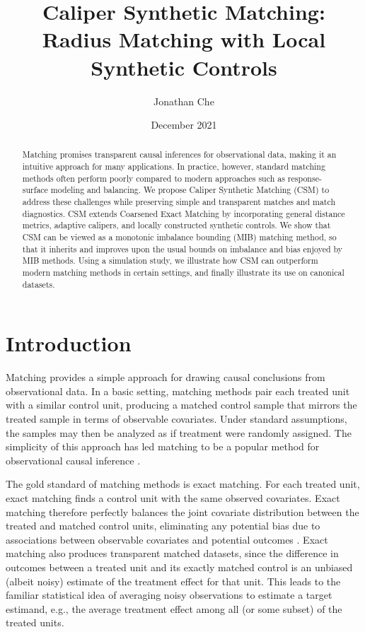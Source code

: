 \documentclass{article}
\title{Caliper Synthetic Matching: Radius Matching with Local Synthetic Controls}
\author{Jonathan Che}
\date{December 2021}
\begin{document}
\maketitle

\begin{abstract}
    Matching promises transparent causal inferences for observational data, making it an intuitive approach for many applications.
    In practice, however, standard matching methods often perform poorly compared to modern approaches such as response-surface modeling and balancing.
    We propose Caliper Synthetic Matching (CSM) to address these challenges while preserving simple and transparent matches and match diagnostics.
    CSM extends Coarsened Exact Matching \citep[CEM; ][]{iacus2012causal} by incorporating general distance metrics, adaptive calipers, and locally constructed synthetic controls.
    We show that CSM can be viewed as a monotonic imbalance bounding (MIB) matching method, so that it inherits and improves upon the usual bounds on imbalance and bias enjoyed by MIB methods.
    Using a simulation study, we illustrate how CSM can outperform modern matching methods in certain settings, and finally illustrate its use on canonical datasets.
\end{abstract}

\section{Introduction}

Matching provides a simple approach for drawing causal conclusions from observational data.
In a basic setting, matching methods pair each treated unit with a similar control unit, producing a matched control sample that mirrors the treated sample in terms of observable covariates.
Under standard assumptions, the samples may then be analyzed as if treatment were randomly assigned.
The simplicity of this approach has led matching to be a popular method for observational causal inference \citep{imbens2004nonparametric}.

The gold standard of matching methods is exact matching.
For each treated unit, exact matching finds a control unit with the same observed covariates.
Exact matching therefore perfectly balances the joint covariate distribution between the treated and matched control units,
eliminating any potential bias due to associations between observable covariates and potential outcomes \citep{imai2008misunderstandings, rosenbaum1985bias}.
Exact matching also produces transparent matched datasets,
since the difference in outcomes between a treated unit and its exactly matched control is an unbiased (albeit noisy) estimate of the treatment effect for that unit.
This leads to the familiar statistical idea of averaging noisy observations to estimate a target estimand, e.g., the average treatment effect among all (or some subset) of the treated units.
\end{document}
